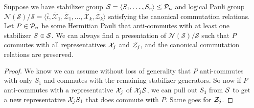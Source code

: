 \begin{lemma}\label{lem:logical_presentation_WLOG_case_2}
    Suppose we have stabilizer group $\mathcal{S} = \langle S_1, \ldots, S_r \rangle \leq \mathcal{P}_n$ and logical Pauli group $\mathcal{N}(\mathcal{S})/\mathcal{S} = \langle \overline{i}, \overline{\mathcal{X}}_1, \overline{\mathcal{Z}}_1, \ldots, \overline{\mathcal{X}}_k, \overline{\mathcal{Z}}_k \rangle$ satisfying the canonical commutation relations.
    Let $P \in \mathcal{P}_n$ be some Hermitian Pauli that anti-commutes with at least one stabilizer $S \in \mathcal{S}$.
    We can always find a presentation of $\mathcal{N}(\mathcal{S})/\mathcal{S}$ such that $P$ commutes with all representatives $\mathcal{X}_j$ and $\mathcal{Z}_j$, and the canonical commutation relations are preserved.
    \begin{proof}
        We know we can assume without loss of generality that $P$ anti-commutes with only $S_1$ and commutes with the remaining stabilizer generators.
        So now if $P$ anti-commutes with a representative $\mathcal{X}_j$ of $\mathcal{X}_j \mathcal{S}$, we can pull out $S_1$ from $\mathcal{S}$ to get a new representative $\mathcal{X}_j S_1$ that does commute with $P$.
        Same goes for $\mathcal{Z}_j$.
    \end{proof}
\end{lemma}

